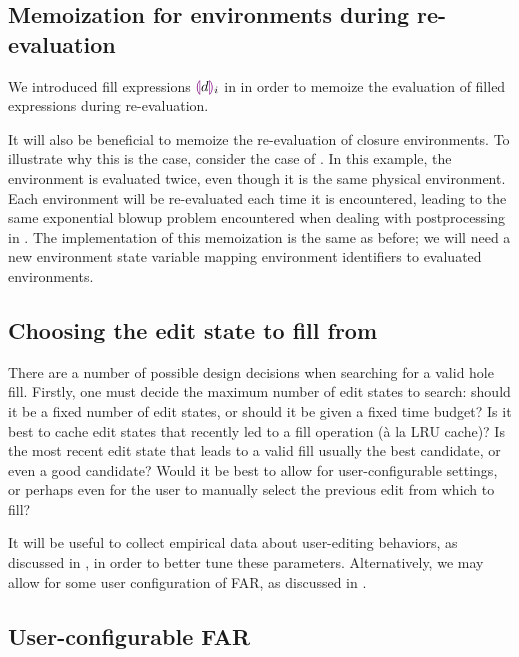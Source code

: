 \subsection{Memoization for environments during re-evaluation}
\label{sec:far-improv-memo-envs}

We introduced fill expressions $\textcolor{violet}{\llparenthesis} d\textcolor{violet}{\rrparenthesis}_i$ in  in order to memoize the evaluation of filled expressions during re-evaluation.

It will also be beneficial to memoize the re-evaluation of closure environments. To illustrate why this is the case, consider the case of . In this example, the environment is evaluated twice, even though it is the same physical environment. Each environment will be re-evaluated each time it is encountered, leading to the same exponential blowup problem encountered when dealing with postprocessing in . The implementation of this memoization is the same as before; we will need a new environment state variable mapping environment identifiers to evaluated environments.

\subsection{Choosing the edit state to fill from}
\label{sec:far-past-edit-states}

There are a number of possible design decisions when searching for a valid hole fill. Firstly, one must decide the maximum number of edit states to search: should it be a fixed number of edit states, or should it be given a fixed time budget? Is it best to cache edit states that recently led to a fill operation (\`a la LRU cache)? Is the most recent edit state that leads to a valid fill usually the best candidate, or even a good candidate? Would it be best to allow for user-configurable settings, or perhaps even for the user to manually select the previous edit from which to fill?

It will be useful to collect empirical data about user-editing behaviors, as discussed in , in order to better tune these parameters. Alternatively, we may allow for some user configuration of FAR, as discussed in .

\subsection{User-configurable FAR}
\label{sec:far-improv-user-config}

